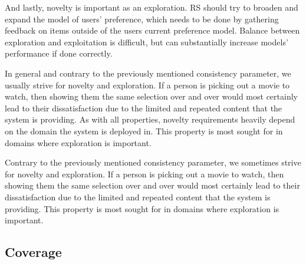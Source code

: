 And lastly, novelty is important as an exploration. RS should try to broaden and expand the model of users' preference, which needs to be done by gathering feedback on items outside of the users current preference model. Balance between exploration and exploitation is difficult, but can substantially increase models' performance if done correctly.

In general and contrary to the previously mentioned consistency parameter, we usually strive for novelty and exploration. If a person is picking out a movie to watch, then showing them the same selection over and over would most certainly lead to their dissatisfaction due to the limited and repeated content that the system is providing. As with all properties, novelty requirements heavily depend on the domain the system is deployed in. This property is most sought for in domains where exploration is important.









Contrary to the previously mentioned consistency parameter, we sometimes strive for novelty and exploration. If a person is picking out a movie to watch, then showing them the same selection over and over would most certainly lead to their dissatisfaction due to the limited and repeated content that the system is providing. This property is most sought for in domains where exploration is important.




\subsection{Coverage}

